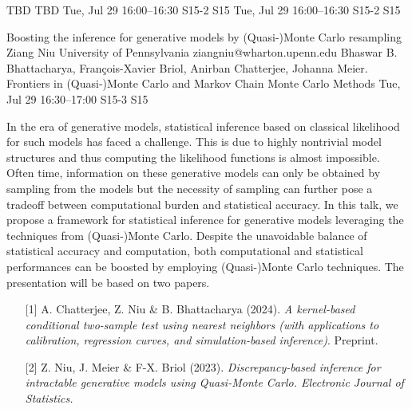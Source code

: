 \begin{talk}
  {TBD}%
  {TBD}%
  {Tue, Jul 29 16:00–16:30}%
  {S15-2}%
  {S15}%
  {}%
  {Tue, Jul 29 16:00–16:30}%
  {S15-2}%
  {S15}%
\end{talk}

\begin{talk}
  {Boosting the inference for generative models by (Quasi-)Monte Carlo resampling}%
  {Ziang Niu}%
  {University of Pennsylvania}%
  {ziangniu@wharton.upenn.edu}%
  {Bhaswar B. Bhattacharya, François-Xavier Briol, Anirban Chatterjee, Johanna Meier.}%
  {Frontiers in (Quasi-)Monte Carlo and Markov Chain Monte Carlo Methods}%
  {Tue, Jul 29 16:30–17:00}%
  {S15-3}%
  {S15}%
				
			
In the era of generative models, statistical inference based on classical likelihood for such models has faced a challenge. This is due to highly nontrivial model structures and thus computing the likelihood functions is almost impossible. Often time, information on these generative models can only be obtained by sampling from the models but the necessity of sampling can further pose a tradeoff between computational burden and statistical accuracy. In this talk, we propose a framework for statistical inference for generative models leveraging the techniques from (Quasi-)Monte Carlo. Despite the unavoidable balance of statistical accuracy and computation, both computational and statistical performances can be boosted by employing (Quasi-)Monte Carlo techniques. The presentation will be based on two papers.

\begin{enumerate}
	\item[{[1]}] A. Chatterjee, Z. Niu \& B. Bhattacharya (2024). {\it A kernel-based conditional two-sample test using nearest neighbors (with applications to calibration, regression curves, and simulation-based inference)}. Preprint.
	\item[{[2]}] Z. Niu, J. Meier \& F-X. Briol (2023). \it{Discrepancy-based inference for
  intractable generative models using
  Quasi-Monte Carlo.} Electronic Journal of Statistics.
\end{enumerate}

\medskip

\end{talk}

